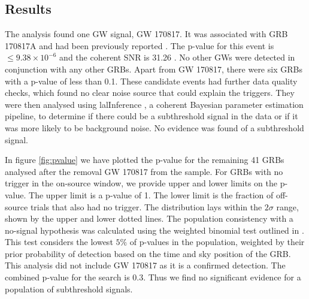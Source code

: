 \documentclass[11pt]{cuthesis}
\begin{document}
\subsection{Results}
The analysis found one GW signal, GW 170817. It was associated with GRB 170817A and had been previously reported \cite{GW170817_det,GW170817_GRB}. The p-value for this event is $\leq 9.38 \times 10^{-6}$ and the coherent SNR is 31.26 \cite{o2grb}. No other GWs were detected in conjunction with any other GRBs. Apart from GW 170817, there were six GRBs with a p-value of less than 0.1. These candidate events had further data quality checks, which found no clear noise source that could explain the triggers. They were then analysed using lalInference \cite{Veitch:2008ur}, a coherent Bayesian parameter estimation pipeline, to determine if there could be a subthreshold signal in the data or if it was more likely to be background noise. No evidence was found of a subthreshold signal. 

In figure \ref{fig:pvalue} we have plotted the p-value for the remaining 41 GRBs analysed after the removal GW 170817 from the sample. For GRBs with no trigger in the on-source window, we provide upper and lower limits on the p-value. The upper limit is a p-value of 1. The lower limit is the fraction of off-source trials that also had no trigger. The distribution lays within the $2\sigma$ range, shown by the upper and lower dotted lines. The population consistency with a no-signal hypothesis was calculated using the weighted binomial test outlined in \cite{abadie}. This test considers the lowest $5\%$ of p-values in the population, weighted by their prior probability of detection based on the time and sky position of the GRB. This analysis did not include GW 170817 as it is a confirmed detection. The combined p-value for the search is 0.3. Thus we find no significant evidence for a population of subthreshold signals.  
\end{document}
